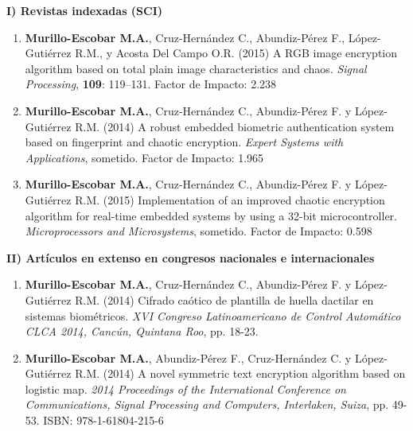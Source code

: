 \textbf{I) Revistas indexadas (SCI)}
\begin{enumerate}
\item \textbf{Murillo-Escobar M.A.}, Cruz-Hernández C., Abundiz-Pérez F., López-Gutiérrez R.M., y Acosta Del Campo O.R. (2015) A RGB image encryption algorithm based on total plain image characteristics and chaos. \textit{Signal Processing}, \textbf{109}: 119–131. Factor de Impacto: 2.238

\item \textbf{Murillo-Escobar M.A.}, Cruz-Hernández C., Abundiz-Pérez F. y López-Gutiérrez R.M. (2014) A robust embedded biometric authentication system based on fingerprint and chaotic encryption. \textit{Expert Systems with Applications}, sometido. Factor de Impacto: 1.965

\item \textbf{Murillo-Escobar M.A.}, Cruz-Hernández C., Abundiz-Pérez F. y López-Gutiérrez R.M. (2015) Implementation of an improved chaotic encryption algorithm for real-time embedded systems by using a 32-bit microcontroller. \textit{Microprocessors and Microsystems}, sometido. Factor de Impacto: 0.598 \\
\end{enumerate}

\textbf{II) Artículos en extenso en congresos nacionales e internacionales}
\begin{enumerate}
\item \textbf{Murillo-Escobar M.A.}, Cruz-Hernández C., Abundiz-Pérez F. y López-Gutiérrez R.M. (2014) Cifrado caótico de plantilla de huella dactilar en sistemas biométricos. \textit{XVI Congreso Latinoamericano de Control Automático CLCA 2014, Cancún, Quintana Roo}, pp. 18-23.

\item \textbf{Murillo-Escobar M.A.}, Abundiz-Pérez F., Cruz-Hernández C. y López-Gutiérrez R.M. (2014) A novel symmetric text encryption algorithm based on logistic map. \textit{2014 Proceedings of the International Conference on Communications, Signal Processing and Computers, Interlaken, Suiza}, pp. 49-53. ISBN: 978-1-61804-215-6 \\
\end{enumerate}


